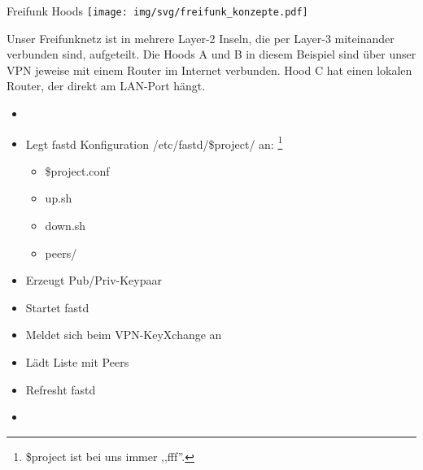 \begin{frame}{Freifunk Hoods}
    \texttt{[image: img/svg/freifunk\_konzepte.pdf]}

    Unser Freifunknetz ist in mehrere Layer-2 Inseln, die per Layer-3 miteinander verbunden sind,
    aufgeteilt. Die Hoods A und B in diesem Beispiel sind über unser VPN jeweise mit einem Router im
    Internet verbunden. Hood C hat einen lokalen Router, der direkt am LAN-Port hängt.
\end{frame}

\begin{frame}{}
    \begin{itemize}
        \item {}
        \item Legt fastd Konfiguration
            /etc/fastd/\$project/  an:
            \footnote{\$project ist bei uns immer ,,fff''.}
            \begin{itemize}
                \item \$project.conf
                \item up.sh
                \item down.sh
                \item peers/
            \end{itemize}
        \item Erzeugt Pub/Priv-Keypaar
        \item Startet fastd
        \item Meldet sich beim VPN-KeyXchange an
        \item Lädt Liste mit Peers
        \item Refresht fastd
        \item {}
    \end{itemize}
\end{frame}

